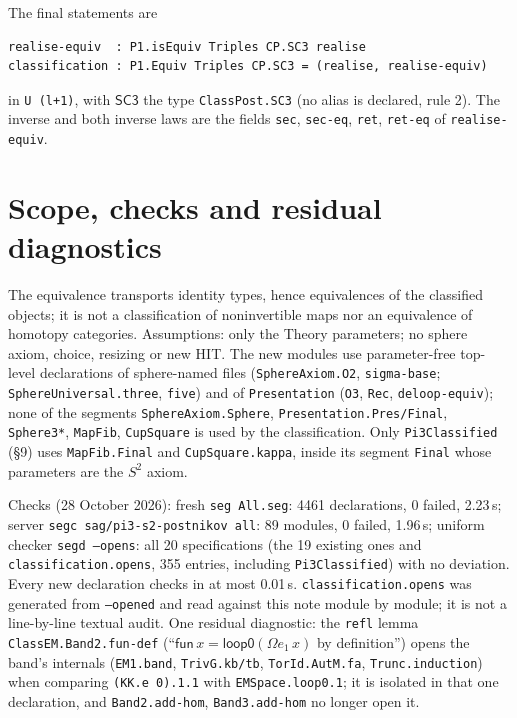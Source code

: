\documentclass[11pt]{amsart}
\theoremstyle{definition}
\theoremstyle{remark}
\newcommand{\Om}{\Omega}
\newcommand{\code}[1]{\texttt{#1}}
\newcommand{\SC}{\mathsf{SC3}}
\begin{document}
The final statements are
\begin{verbatim}
realise-equiv  : P1.isEquiv Triples CP.SC3 realise
classification : P1.Equiv Triples CP.SC3 = (realise, realise-equiv)
\end{verbatim}
in \code{U (l+1)}, with $\SC$ the type \code{ClassPost.SC3} (no alias is declared, rule 2). The
inverse and both inverse laws are the fields \code{sec}, \code{sec-eq}, \code{ret},
\code{ret-eq} of \code{realise-equiv}.

\section{Scope, checks and residual diagnostics}
The equivalence transports identity types, hence equivalences of the classified objects; it is
not a classification of noninvertible maps nor an equivalence of homotopy categories.
Assumptions: only the Theory parameters; no sphere axiom, choice, resizing or new HIT. The new
modules use parameter-free top-level declarations of sphere-named files (\code{SphereAxiom.O2},
\code{sigma-base}; \code{SphereUniversal.three}, \code{five}) and of \code{Presentation}
(\code{O3}, \code{Rec}, \code{deloop-equiv}); none of the segments \code{SphereAxiom.Sphere},
\code{Presentation.Pres/Final}, \code{Sphere3*}, \code{MapFib}, \code{CupSquare} is used by the
classification. Only \code{Pi3Classified} (\S9) uses \code{MapFib.Final} and \code{CupSquare.kappa},
inside its segment \code{Final} whose parameters are the $S^2$ axiom.

Checks (28 October 2026): fresh \code{seg All.seg}: 4461 declarations, 0 failed, 2.23\,s;
server \code{segc sag/pi3-s2-postnikov all}: 89 modules, 0 failed, 1.96\,s; uniform checker
\code{segd --opens}: all 20 specifications (the 19 existing ones and \code{classification.opens},
355 entries, including \code{Pi3Classified}) with no deviation. Every new declaration checks in at most 0.01\,s.
\code{classification.opens} was generated from \code{--opened} and read against this note module by
module; it is not a line-by-line textual audit. One residual diagnostic: the \code{refl} lemma
\code{ClassEM.Band2.fun-def} (``$\mathsf{fun}\,x=\mathsf{loop0}(\Om e_1\,x)$ by definition'') opens
the band's internals (\code{EM1.band}, \code{TrivG.kb/tb}, \code{TorId.AutM.fa},
\code{Trunc.induction}) when comparing \code{(KK.e 0).1.1} with \code{EMSpace.loop0.1}; it is
isolated in that one declaration, and \code{Band2.add-hom}, \code{Band3.add-hom} no longer open it.
\end{document}
